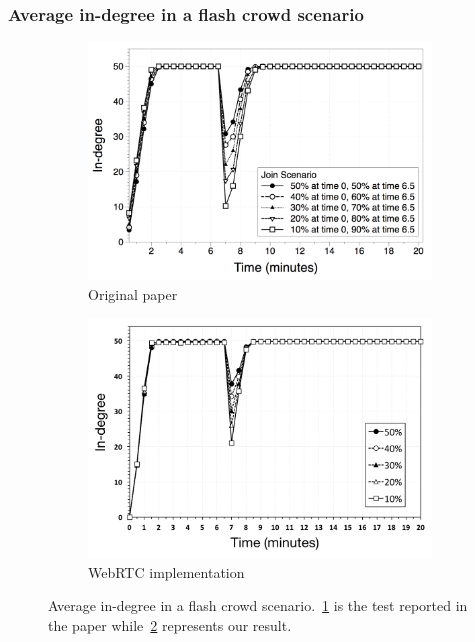 \documentclass{beamer}
\begin{document}
\begin{frame}
\frametitle{Average in-degree in a flash crowd scenario}

\begin{figure}
\centering
\begin{subfigure}{.5\textwidth}
  \centering
  \includegraphics[keepaspectratio=true, width=1\linewidth]{images/paper_average_indegree}
  \caption{Original paper}
  \label{fig:paper_average_indegree}
\end{subfigure}%
\begin{subfigure}{.5\textwidth}
  \centering
  \includegraphics[keepaspectratio=true, width=1\linewidth]{images/average_indegree}
  \caption{WebRTC implementation}
  \label{fig:average_indegree}
\end{subfigure}
\caption{Average in-degree in a flash crowd scenario.~\ref{fig:paper_average_indegree} is the test reported in the paper while~\ref{fig:average_indegree} represents our result.}
\label{fig:robustness_indegree_flash_crowd}
\end{figure}

\end{frame}
\end{document}
